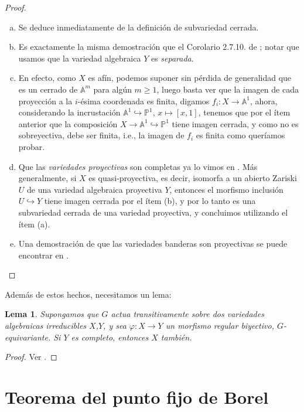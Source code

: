 \documentclass[spanish,10pt]{amsart}
\newtheorem{lemma}[theorem]{Lema}
\theoremstyle{definition}
\theoremstyle{remark}
\numberwithin{equation}{section}
\newcommand{\afine}[1]{\mathbb{A}^{#1}}
\newcommand{\projective}[1]{\mathbb{P}^{#1}}
\begin{document}
\begin{proof}
\begin{enumerate}[(a)]
\item Se deduce inmediatamente de la definición de subvariedad cerrada.
\item Es exactamente la misma demostración que el Corolario 2.7.10. de \cite{notas_pedro}; notar que usamos que la variedad algebraica $Y$ es \textit{separada}.
\item En efecto, como $X$ es afín, podemos suponer sin pérdida de generalidad que es un cerrado de $\afine m$ para algún $m \geq 1$, luego basta ver que la imagen de cada proyección a la $i$-ésima coordenada es finita, digamos $f_i : X \to \afine 1$, ahora, considerando la incrustación $\afine 1 \hookrightarrow \projective 1$, $x \mapsto [x, 1]$, tenemos que por el ítem anterior que la composición $X \to \afine 1 \hookrightarrow \projective 1$ tiene imagen cerrada, y como no es sobreyectiva, debe ser finita, i.e., la imagen de $f_i$ es finita como queríamos probar.
\item Que las \textit{variedades proyectivas} son completas ya lo vimos en \cite[Teorema \emph{2.7.9}]{notas_pedro}. Más generalmente, si $X$ es quasi-proyectiva, es decir, isomorfa a un abierto Zariski $U$ de una variedad algebraica proyectiva $Y$, entonces el morfismo inclusión $U \hookrightarrow Y$ tiene imagen cerrada por el ítem (b), y por lo tanto es una subvariedad cerrada de una variedad proyectiva, y concluimos utilizando el ítem (a).
\item Una demostración de que las variedades banderas son proyectivas se puede encontrar en \cite[Teorema 3.3.11.]{geckMeinolf2013introductionToAlgebraicGeometryAndAlgebraicGroups}.
\end{enumerate}
\end{proof}

Además de estos hechos, necesitamos un lema:

\begin{lemma}\label{lema:lema para variedades completas}
Supongamos que $G$ actua transitivamente sobre dos variedades algebraicas irreducibles $X$,$Y$, y sea $\varphi : X \to Y$ un morfismo regular biyectivo, $G$-equivariante. Si $Y$ es completo, entonces $X$ también.
\end{lemma}
\begin{proof}
Ver \cite[Lema \S 21.1.]{humphreys2012linearAlgebraicGroups}.
\end{proof}


\section{Teorema del punto fijo de Borel}
\end{document}
